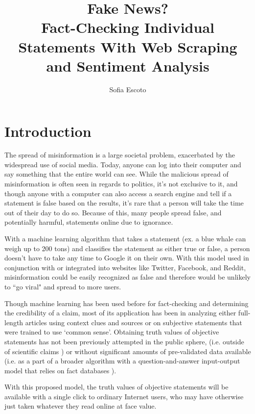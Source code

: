 \documentclass[]{article}
\title{Fake News?
	\\Fact-Checking Individual Statements With Web Scraping and Sentiment Analysis}
\author{Sofia Escoto}
\begin{document}
	\maketitle
	
	\section{Introduction}
		
		
		The spread of misinformation is a large societal problem, exacerbated by the widespread use of social media. Today, anyone can log into their computer and say something that the entire world can see. While the malicious spread of misinformation is  often seen in regards to politics, it's not exclusive to it, and though anyone with a computer can also access a search engine and tell if a statement is false based on the results, it's rare that a person will take the time out of their day to do so. Because of this, many people spread false, and potentially harmful, statements online due to ignorance.
		
		With a machine learning algorithm that takes a statement (ex. a blue whale can weigh up to 200 tons) and classifies the statement as either true or false, a person doesn't have to take any time to Google it on their own. With this model used in conjunction with or integrated into websites like Twitter, Facebook, and Reddit, misinformation could be easily recognized as false and therefore would be unlikely to ``go viral" and spread to more users. 
		
		Though machine learning has been used before for fact-checking and determining the credibility of a claim, most of its application has been in analyzing either full-length articles using context clues and sources or on subjective statements that were trained to use `common sense'. Obtaining truth values of objective statements has not been previously attempted in the public sphere, (i.e. outside of scientific claims \cite{wadden20}) or without significant amounts of pre-validated data available (i.e. as a part of a broader algorithm with a question-and-answer input-output model that relies on fact databases \cite{lazarski21}).
		
		 With this proposed model, the truth values of objective statements will be available with a single click to ordinary Internet users, who may have otherwise just taken whatever they read online at face value.
		
\end{document}
